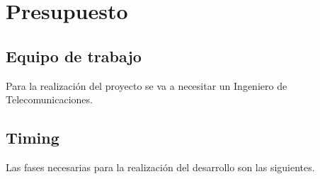 %
%
%
% 
%
%
%
%

\chapter{Presupuesto}
\label{cha:presupuesto}

\section{Equipo de trabajo}

Para la realización del proyecto se va a necesitar un Ingeniero de Telecomunicaciones.

\section{Timing}

Las fases necesarias para la realización del desarrollo son las siguientes.

